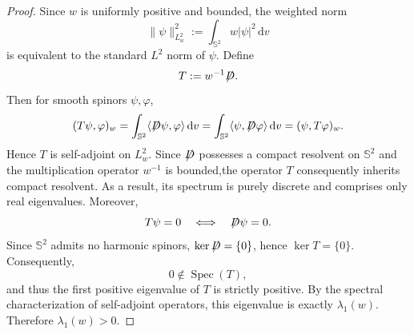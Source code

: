 \documentclass[a4paper, 12pt]{article}
\def\slashiii#1{\setbox0=\hbox{$#1$}#1\hskip-\wd0\hbox to\wd0{\hss\sl/\/\hss}}
\begin{document}
\begin{proof}
	Since $w$ is uniformly positive and bounded, the weighted norm
	\[
	\|\psi\|_{L^2_w}^2:=\int_{\mathbb{S}^2}w|\psi|^2\,\text{d}v
	\]
	is equivalent to the standard $L^2$ norm of $\psi$. Define
	\[
	T:=w^{-1}\slashiii{D}.
	\]
	Then for smooth spinors $\psi,\varphi$,
	\[
	(T\psi,\varphi)_w
	=
	\int_{\mathbb{S}^2}\langle \slashiii{D}\psi,\varphi\rangle\,\text{d}v
	=
	\int_{\mathbb{S}^2}\langle\psi,\slashiii{D}\varphi\rangle\,\text{d}v
	=
	(\psi,T\varphi)_w.
	\]
	Hence $T$ is self-adjoint on $L^2_w$. Since $\slashiii{D}$ possesses a compact resolvent on
	$\mathbb{S}^2$ and the multiplication operator $w^{-1}$ is bounded,the operator $T$ consequently inherits compact resolvent. As a result, its spectrum is purely discrete and comprises only real
	eigenvalues.  Moreover,
	\[
	T\psi=0
	\quad\Longleftrightarrow\quad
	\slashiii{D}\psi=0.
	\]
	Since $\mathbb{S}^2$ admits no harmonic spinors, $\ker \slashiii{D}=\{0\}$, hence
	$\ker T=\{0\}$. Consequently,
	\[
	0\notin \operatorname{Spec}(T),
	\]
	and thus the first positive eigenvalue of $T$ is strictly positive.
	By the spectral characterization of self-adjoint operators, this
	eigenvalue is exactly $\lambda_1(w)$. Therefore $	\lambda_1(w)>0.$
\end{proof}


\
\
\end{document}
